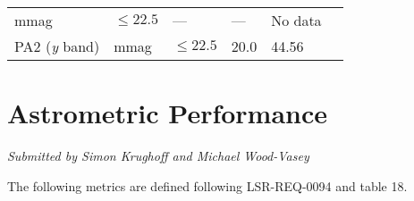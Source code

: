 \documentclass[DM,toc]{lsstdoc}
\begin{document}
\begin{longtable}[]{@{}llllll@{}}
\begin{minipage}[t]{0.06\columnwidth}
mmag\strut
\end{minipage} & \begin{minipage}[t]{0.17\columnwidth}\raggedright\strut
\(\leq 22.5\)\strut
\end{minipage} & \begin{minipage}[t]{0.17\columnwidth}\raggedright\strut
---\strut
\end{minipage} & \begin{minipage}[t]{0.12\columnwidth}\raggedright\strut
---\strut
\end{minipage} & \begin{minipage}[t]{0.17\columnwidth}\raggedright\strut
No data\strut
\end{minipage}\tabularnewline
\begin{minipage}[t]{0.14\columnwidth}\raggedright\strut
PA2 (\emph{y} band)\strut
\end{minipage} & \begin{minipage}[t]{0.06\columnwidth}\raggedright\strut
mmag\strut
\end{minipage} & \begin{minipage}[t]{0.17\columnwidth}\raggedright\strut
\(\leq 22.5\)\strut
\end{minipage} & \begin{minipage}[t]{0.17\columnwidth}\raggedright\strut
20.0\strut
\end{minipage} & \begin{minipage}[t]{0.12\columnwidth}\raggedright\strut
44.56\strut
\end{minipage} & \begin{minipage}[t]{0.17\columnwidth}\raggedright\strut
\strut
\end{minipage}\tabularnewline
\bottomrule
\end{longtable}

\section{Astrometric Performance}\label{astrometric-performance}

\emph{Submitted by Simon Krughoff and Michael Wood-Vasey}

The following metrics are defined following LSR-REQ-0094
 and  table 18.
\end{document}
